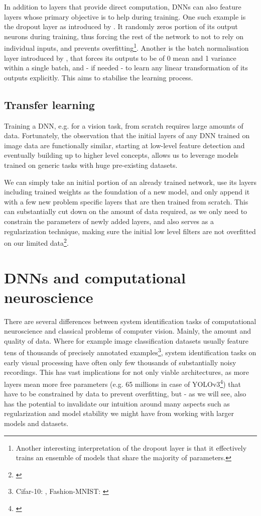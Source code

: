 In addition to layers that provide direct computation, DNNs can also feature layers whose primary objective is to help during training. One such example is the dropout layer as introduced by \cite{JMLR:v15:srivastava14a}. It randomly zeros portion of its output neurons during training, thus forcing the rest of the network to not to rely on individual inputs, and prevents overfitting\footnote{Another interesting interpretation of the dropout layer is that it effectively trains an ensemble of models that share the majority of parameters.}. Another is the batch normalisation layer introduced by \cite{2015arXiv150203167I}, that forces its outputs to be of 0 mean and 1 variance within a single batch, and - if needed - to learn any linear transformation of its outputs explicitly. This aims to stabilise the learning process. 

\subsection{Transfer learning}
Training a DNN, e.g. for a vision task, from scratch requires large amounts of data. Fortunately, the observation that the initial layers of any DNN trained on image data are functionally similar, starting at low-level feature detection and eventually building up to higher level concepts, allows us to leverage models trained on generic tasks with huge pre-existing datasets. 

We can simply take an initial portion of an already trained network, use its layers including trained weights as the foundation of a new model, and only append it with a few new problem specific layers that are then trained from scratch. This can substantially cut down on the amount of data required, as we only need to constrain the parameters of newly added layers, and also serves as a regularization technique, making sure the initial low level filters are not overfitted on our limited data\footnote{\cite{2018arXiv180801974T}}. 

\section{DNNs and computational neuroscience}
There are several differences between system identification tasks of computational neuroscience and classical problems of computer vision. Mainly, the amount and quality of data. Where for example image classification datasets usually feature tens of thousands of precisely annotated examples\footnote{Cifar-10: \cite{cifar10}, Fashion-MNIST: \cite{xiao2017}}, system identification tasks on early visual processing have often only few thousands of substantially noisy recordings. This has vast implications for not only viable architectures, as more layers mean more free parameters (e.g. 65 millions in case of YOLOv3\footnote{\cite{2018arXiv180402767R}}) that have to be constrained by data to prevent overfitting, but - as we will see, also has the potential to invalidate our intuition around many aspects such as regularization and model stability we might have from working with larger models and datasets. 

